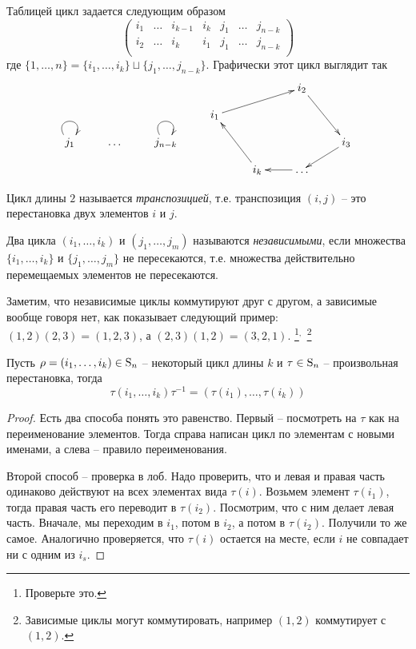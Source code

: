 Таблицей цикл задается следующим образом
\[
\begin{pmatrix}
{i_1}&{\ldots}&{i_{k-1}}&{i_k}&{j_1}&{\ldots}&{j_{n-k}}\\
{i_2}&{\ldots}&{i_k}&{i_1}&{j_{1}}&{\ldots}&{j_{n-k}}\\
\end{pmatrix}
\]
где $\{1,\ldots,n\} = \{i_1,\ldots,i_k\}\sqcup\{j_1,\ldots,j_{n-k}\}$.
Графически этот цикл выглядит так
\[
\xymatrix@R=10pt{
	{}&{}&{}&{}&{}&{i_2}\ar[rdd]&{}\\
	{}&{}&{}&{i_1}\ar[urr]&{}&{}&{}\\
	{j_1}\ar@(ul,ur)&{\ldots}&{j_{n-k}}\ar@(ul,ur)&{}&{}&{}&{i_3}\ar[dl]\\
	{}&{}&{}&{}&{i_k}\ar[uul]&{\ldots}\ar[l]&{}\\
}
\]

\begin{definition}
\label{def::Transpose}
Цикл длины $2$ называется {\it транспозицией}, т.е. транспозиция $(i,j)$ -- это перестановка двух элементов $i$ и $j$.
\end{definition}

\begin{definition}
\label{def::IndepCycles}
Два цикла $(i_1,\ldots,i_k)$ и $(j_1,\ldots,j_m)$ называются {\it независимыми}, если множества $\{i_1,\ldots,i_k\}$ и $\{j_1,\ldots,j_m\}$ не пересекаются, т.е. множества действительно перемещаемых элементов не пересекаются.
\end{definition}
Заметим, что независимые циклы коммутируют друг с другом, а зависимые вообще говоря нет, как показывает следующий пример: $(1,2)(2,3) = (1,2,3)$, а $(2,3)(1,2) = (3,2,1)$.%
\footnote{Проверьте это.}${}^{,\,}$%
\footnote{Зависимые циклы могут коммутировать, например $(1,2)$ коммутирует с $(1,2)$.}

\begin{claim}
\label{claim:CycleRename}
Пусть $\rho = (i_1,\ldots, i_k)\in\operatorname{S}_{n}$ -- некоторый цикл длины $k$ и $\tau\in\operatorname{S}_{n}$ -- произвольная перестановка, тогда 
\[
\tau(i_1,\ldots,i_k)\tau^{-1} = (\tau(i_1),\ldots,\tau(i_k))
\]
\end{claim}
\begin{proof}
Есть два способа понять это равенство.
Первый -- посмотреть на $\tau$ как на переименование элементов.
Тогда справа написан цикл по элементам с новыми именами, а слева -- правило переименования.

Второй способ -- проверка в лоб.
Надо проверить, что и левая и правая часть одинаково действуют на всех элементах вида $\tau(i)$.
Возьмем элемент $\tau(i_1)$, тогда правая часть его переводит в $\tau(i_2)$.
Посмотрим, что с ним делает левая часть.
Вначале, мы переходим в $i_1$, потом в $i_2$, а потом в $\tau(i_2)$.
Получили то же самое.
Аналогично проверяется, что $\tau(i)$ остается на месте, если $i$ не совпадает ни с одним из $i_s$.
\end{proof}

